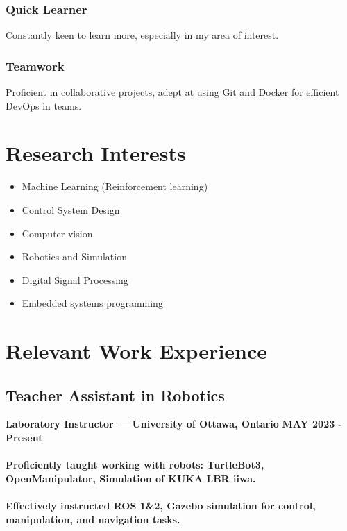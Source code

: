 \documentclass[a4paper]{article}
\begin{document}
\subsubsection{Quick Learner}
Constantly keen to learn more, especially in my area of interest.
    
\subsubsection{Teamwork}
Proficient in collaborative projects, adept at using Git and Docker for efficient DevOps in teams.

\section{Research Interests}
\begin{multicols}{2}[]
    \begin{itemize}
        \itemsep0em 
        \item Machine Learning (Reinforcement learning)
        \item Control System Design
        \item Computer vision
        \item Robotics and Simulation
        \item Digital Signal Processing
        \item Embedded systems programming
    \end{itemize}
\end{multicols}


\section{Relevant Work Experience}
\subsection{Teacher Assistant in Robotics}
{\bfseries\small Laboratory Instructor — University of Ottawa, Ontario}
\hfill
{\bfseries\small MAY 2023 - Present}

\paragraph{Proficiently taught working with robots: TurtleBot3, OpenManipulator, Simulation of KUKA LBR iiwa.}
\paragraph{Effectively instructed ROS 1\&2, Gazebo simulation for control, manipulation, and navigation tasks.}
\end{document}
